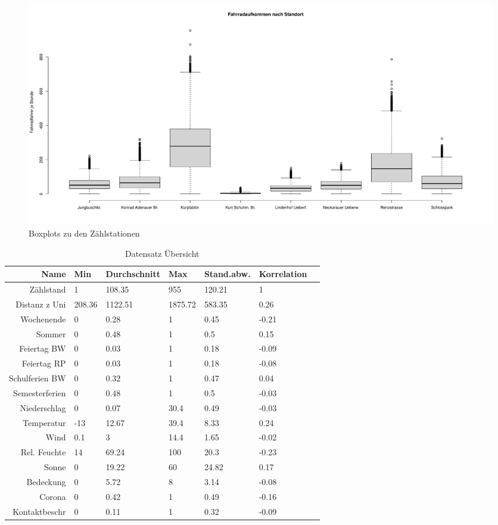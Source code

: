 \documentclass[a4paper,12pt]{thesis}
\begin{document}
\begin{figure}[!ht]
	\centering
	\includegraphics[width=\textwidth]{Plots/Boxplot_Stationen.pdf}
	\caption{Boxplots zu den Zählstationen}
	\label{BoxplotStationen}
\end{figure}

\begin{table}[!ht]
	\centering
	\caption{Datensatz Übersicht}
	\begin{tabular}[t]{rllllll}
		\toprule
		Name & Min & Durchschnitt & Max & Stand.abw. & Korrelation \\ 
		\midrule
		Zählstand & 1 & 108.35 & 955 & 120.21 & 1 \\ 
		Distanz z Uni & 208.36 & 1122.51 & 1875.72 & 583.35 & 0.26 \\ 
		Wochenende & 0 & 0.28 & 1 & 0.45 & -0.21 \\ 
		Sommer & 0 & 0.48 & 1 & 0.5 & 0.15 \\ 
		Feiertag BW & 0 & 0.03 & 1 & 0.18 & -0.09 \\ 
		Feiertag RP & 0 & 0.03 & 1 & 0.18 & -0.08 \\ 
		Schulferien BW & 0 & 0.32 & 1 & 0.47 & 0.04 \\ 
		Semesterferien & 0 & 0.48 & 1 & 0.5 & -0.03 \\ 
		Niederschlag & 0 & 0.07 & 30.4 & 0.49 & -0.03 \\ 
		Temperatur & -13 & 12.67 & 39.4 & 8.33 & 0.24 \\ 
		Wind & 0.1 & 3 & 14.4 & 1.65 & -0.02 \\ 
		Rel. Feuchte & 14 & 69.24 & 100 & 20.3 & -0.23 \\ 
		Sonne & 0 & 19.22 & 60 & 24.82 & 0.17 \\ 
		Bedeckung & 0 & 5.72 & 8 & 3.14 & -0.08 \\ 
		Corona & 0 & 0.42 & 1 & 0.49 & -0.16 \\ 
		Kontaktbeschr & 0 & 0.11 & 1 & 0.32 & -0.09 \\ 
		\hline
	\end{tabular}
	\label{Tabelle1}
\end{table}
\end{document}
